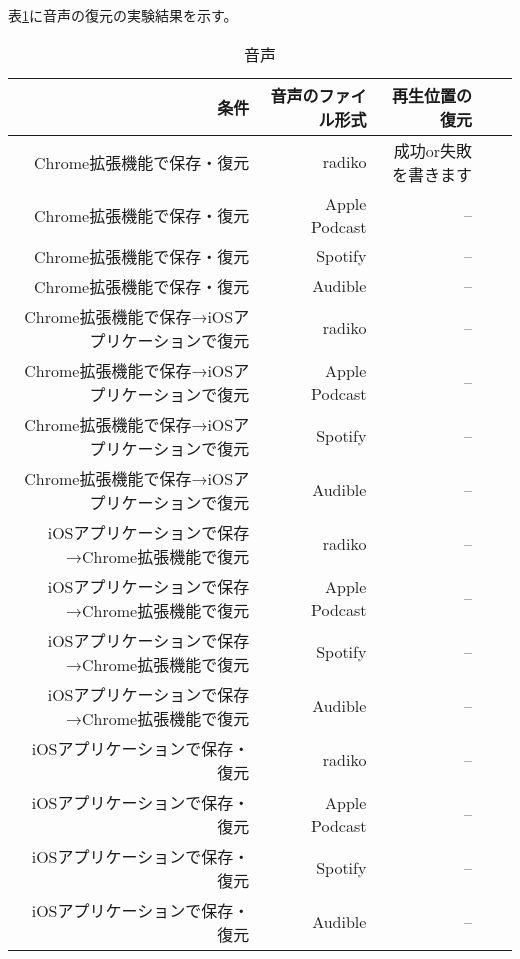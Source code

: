 表\ref{tb:evl-result-audio}に音声の復元の実験結果を示す。

\begin{table}[htbp]
  \caption{音声}
  \label{tb:evl-result-audio}
  \begin{center}
    \begin{tabular}{rrrrr}
      \hline
      条件 & 音声のファイル形式 & 再生位置の復元 \\ \hline \hline
      Chrome拡張機能で保存・復元 & radiko & 成功or失敗を書きます  \\ \hline
      Chrome拡張機能で保存・復元 & Apple Podcast & --  \\ \hline
      Chrome拡張機能で保存・復元 & Spotify & --  \\ \hline
      Chrome拡張機能で保存・復元 & Audible & --  \\ \hline
      Chrome拡張機能で保存→iOSアプリケーションで復元 & radiko & --  \\ \hline
      Chrome拡張機能で保存→iOSアプリケーションで復元 & Apple Podcast & --  \\ \hline
      Chrome拡張機能で保存→iOSアプリケーションで復元 & Spotify & --  \\ \hline
      Chrome拡張機能で保存→iOSアプリケーションで復元 & Audible & --  \\ \hline
      iOSアプリケーションで保存→Chrome拡張機能で復元 & radiko & --  \\ \hline
      iOSアプリケーションで保存→Chrome拡張機能で復元 & Apple Podcast & --  \\ \hline
      iOSアプリケーションで保存→Chrome拡張機能で復元 & Spotify & --  \\ \hline
      iOSアプリケーションで保存→Chrome拡張機能で復元 & Audible & --  \\ \hline
      iOSアプリケーションで保存・復元 & radiko & --  \\ \hline
      iOSアプリケーションで保存・復元 & Apple Podcast & --  \\ \hline
      iOSアプリケーションで保存・復元 & Spotify & --  \\ \hline
      iOSアプリケーションで保存・復元 & Audible & --  \\ \hline
    \end{tabular}
  \end{center}
\end{table}
